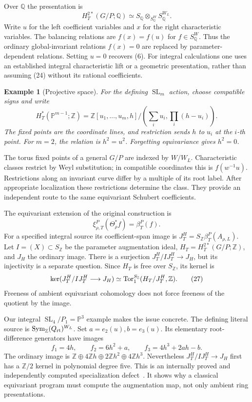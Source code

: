 \documentclass[11pt,letterpaper]{article}
\newcommand{\Z}{\mathbb Z}\newcommand{\Q}{\mathbb Q}\newcommand{\C}{\mathbb C}
\newcommand{\Sym}{\operatorname{Sym}}\newcommand{\Rep}{\operatorname{Rep}}
\newcommand{\SL}{\operatorname{SL}}\newcommand{\GL}{\operatorname{GL}}
\newtheorem{example}[theorem]{Example}
\theoremstyle{definition}\newtheorem{definition}[theorem]{Definition}
\begin{document}
Over \(\Q\) the presentation is
\[
 H_T^{2*}(G/P;\Q)\simeq
 S_\Q\otimes_{S_\Q^W}S_\Q^{W_L}.
 \tag{24}
\]
Write \(u\) for the left coefficient variables and \(x\) for the
right characteristic variables. The balancing relations are
\(f(x)=f(u)\) for \(f\in S_\Q^W\).
Thus the ordinary global-invariant relations \(f(x)=0\) are replaced
by parameter-dependent relations. Setting \(u=0\) recovers (6).
For integral calculations one uses an established integral
characteristic lift or a geometric presentation, rather than
assuming (24) without its rational coefficients.

\begin{example}[Projective space]
For the defining \(\SL_m\) action, choose compatible signs and write
\[
 H_T^*(\mathbb P^{m-1};\Z)
 =\Z[u_1,\ldots,u_m,h]/\left(\sum_i u_i,\prod_i(h-u_i)\right).
 \tag{25}
\]
The fixed points are the coordinate lines, and restriction sends
\(h\) to \(u_i\) at the \(i\)-th point. For \(m=2\), the relation is
\(h^2=u^2\). Forgetting equivariance gives \(h^2=0\).
\end{example}

The torus fixed points of a general \(G/P\) are indexed by \(W/W_L\).
Characteristic classes restrict by Weyl substitution; in compatible
coordinates this is \(f(w^{-1}u)\).
Restrictions along an invariant curve differ by a multiple of its
root label. After appropriate localization these restrictions
determine the class. They provide an independent route to the
same equivariant Schubert coefficients.

The equivariant extension of the original construction is
\[
 \xi_{\rho,T}^P(\Theta_\rho^*f)=\beta_T^P(f).
 \tag{26}
\]
For a specified integral source its coefficient-span image is
\(J_T^H=S_\Z\beta_T^P(A_{\rho,L})\).
Let \(I=(X)\subset S_\Z\) be the parameter augmentation ideal,
\(H_T=H_T^{2*}(G/P;\Z)\), and \(J_H\) the ordinary image.
There is a surjection \(J_T^H/IJ_T^H\to J_H\), but its injectivity is
a separate question. Since \(H_T\) is free over \(S_\Z\), its kernel is
\[
 \ker(J_T^H/IJ_T^H\longrightarrow J_H)
 \simeq \Tor_1^{S_\Z}(H_T/J_T^H,\Z).
 \tag{27}
\]
Freeness of ambient equivariant cohomology does not force freeness
of the quotient by the image.

Our integral \(\SL_4/P_1=\mathbb P^3\) example makes the issue concrete.
The defining literal source is \(\Sym_\Z(Q_{\rm rt})^{W_L}\).
Set \(a=e_2(u), b=e_3(u)\). Its elementary root-difference generators
have images
\[
 f_1=4h,\qquad f_2=6h^2+a,\qquad f_3=4h^3+2ah-b.
 \tag{28}
\]
The ordinary image is
\(\Z\oplus4\Z h\oplus2\Z h^2\oplus4\Z h^3\).
Nevertheless \(J_T^H/IJ_T^H\to J_H\) first has a \(\Z/2\) kernel
in polynomial degree five. This is an internally proved and
independently computed specialization defect~\cite{Exploration}.
It shows why a classical equivariant program must compute the
augmentation map, not only ambient ring presentations.
\end{document}
